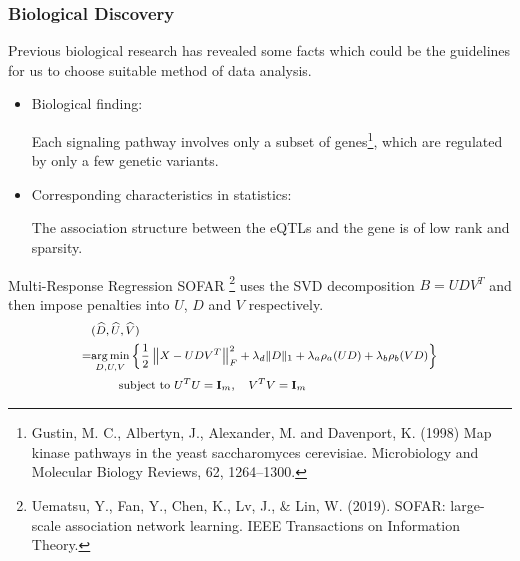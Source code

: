 \begin{frame}\frametitle{Biological Discovery}
    Previous biological research has revealed some facts which could be the guidelines for us to choose suitable method of data analysis.

    \begin{itemize}
        
        \item Biological finding: 
        
              Each signaling pathway involves only a subset of genes\footnote[1]{Gustin, M. C., Albertyn, J., Alexander, M. and Davenport, K. (1998) Map kinase pathways in the yeast saccharomyces cerevisiae. Microbiology and Molecular Biology Reviews, 62, 1264–1300.}, which are regulated by only a few genetic variants.

        \item Corresponding characteristics in statistics: 
        
              The association structure between the eQTLs and the gene is of low rank and sparsity.
    \end{itemize}
\end{frame}

\begin{frame}{Multi-Response Regression}
    SOFAR \footnote[1]{Uematsu, Y., Fan, Y., Chen, K., Lv, J., \& Lin, W. (2019). SOFAR: large-scale association network learning. IEEE Transactions on Information Theory.} 
    uses the SVD decomposition $B= UDV^T$ and then impose penalties into $U$, $D$ and $V$ respectively. 
    \begin{equation}\footnotesize
        \begin{split}
            & (\widehat{D}, \widehat{U}, \widehat{V}) \\
            = & \underset{D, U, V}{\arg \min }\left\{\frac{1}{2} \left\|X- UDV^{T}\right\|_{F}^{2}+\lambda_{d}\|D\|_{1}+\lambda_{a} \rho_{a}(U D)+\lambda_{b} \rho_{b}(VD)\right\} \\ 
            & \quad\quad \text { subject to } U^{T} U=\mathbf{I}_{m}, \quad V^{T} V=\mathbf{I}_{m} 
        \end{split}
    \end{equation}
\end{frame}

